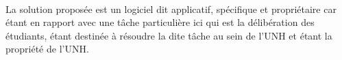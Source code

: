 \paragraph{}
La solution proposée est un logiciel dit applicatif, spécifique et propriétaire
car étant en rapport avec une tâche
particulière ici qui est la délibération des étudiants, 
étant destinée à résoudre la dite tâche au sein de l'UNH et
étant la propriété de l'UNH.